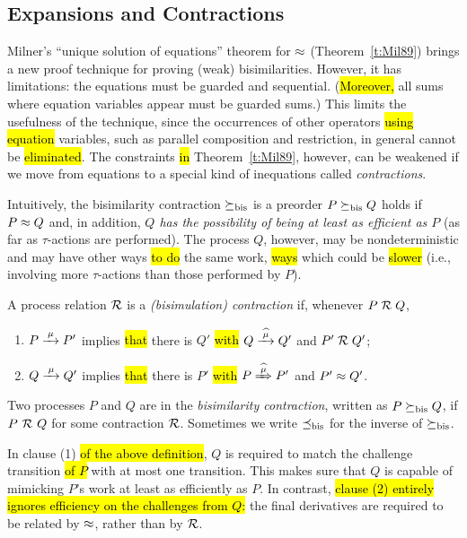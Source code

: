 \subsection{Expansions and Contractions}
\label{s:mcontr}

Milner's ``unique solution of equations'' theorem for $\approx$
(Theorem~\ref{t:Mil89})
brings a new proof technique for proving (weak) bisimilarities. However, it has
 limitations: the equations must be guarded and sequential. (\hl{Moreover,}
all sums where equation variables appear must be guarded sums.)
This limits the usefulness of the technique, since
the occurrences of other operators \hl{using equation} variables, such as parallel
composition and restriction,
in general cannot be \hl{eliminated}. %
The constraints \hl{in} Theorem~\ref{t:Mil89}, however, can be
weakened if we move from equations to a special kind of inequations called
  \emph{contractions}.

Intuitively, the bisimilarity contraction $\mathrel{\succeq_{\rm{bis}}}$ is a preorder
 $P \mathrel{\succeq_{\rm{bis}}} Q$ holds if $P \approx Q$ and, in addition, 
\emph{$Q$ has the possibility of being at least as efficient as $P$} (as far as
$\tau$-actions are performed).
The process $Q$, however, may be nondeterministic and may have other ways
\hl{to do} the same work, \hl{ways} which could be \hl{slower} (i.e., involving
more $\tau$-actions than those performed by $P$).

\begin{definition}[contraction]
\label{d:BisCon}
A process relation ${{\cal R}}$ 
 is a \emph{(bisimulation) contraction} if, whenever $P\mathrel{\cal R} Q$,

\begin{enumerate}
\item $P \arr\mu P'$ implies \hl{that} there is $Q'$ \hl{with} $Q \arcap \mu
  Q'$ and $P' \mathrel{\cal R} Q'$;
\item $Q \arr\mu Q'$ implies \hl{that} there is $P'$ \hl{with} $P \Arcap \mu
 P'$ and $P' \approx Q'$.
\end{enumerate}
Two processes $P$ and $Q$ are in the \emph{bisimilarity
contraction}, written as $P \mathrel{\succeq_{\rm{bis}}} Q$,
if $P\ {\cal R}\ Q$ for some contraction ${\cal R}$.
Sometimes we write $\mathrel{\preceq_{\rm{bis}}}$ for the inverse of $\mathrel{\succeq_{\rm{bis}}}$.
\end{definition}
In clause (1) \hl{of the above definition}, $Q$ is required to match the challenge
transition \hl{of $P$} with at most one transition.
This makes sure that $Q$ is capable of mimicking %
$P$'s work at least as efficiently as $P$. 
In contrast, \hl{clause (2) entirely ignores efficiency on the challenges from $Q$:}
the final derivatives are required to be related by $\approx$, rather than by ${\cal R}$.

